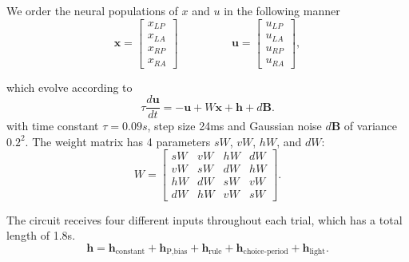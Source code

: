 \documentclass[11pt]{article}
\begin{document}
We order the neural populations of $x$ and $u$ in the following manner
\begin{equation}
\mathbf{x} = \begin{bmatrix} x_{LP} \\ x_{LA} \\ x_{RP} \\ x_{RA} \end{bmatrix} \hspace{2cm} \mathbf{u} = \begin{bmatrix} u_{LP} \\ u_{LA} \\ u_{RP} \\ u_{RA} \end{bmatrix},
\end{equation}

which evolve according to
\begin{equation}
\tau \frac{d\mathbf{u}}{dt} = -\mathbf{u} + W\mathbf{x} + \mathbf{h} + d\mathbf{B}.
\end{equation}
with time constant $\tau = 0.09s$, step size 24ms and Gaussian noise $d\mathbf{B}$ of variance $0.2^2$.  
The weight matrix has 4 parameters $sW$, $vW$, $hW$, and $dW$:
\begin{equation}
W = \begin{bmatrix} sW & vW & hW & dW \\ vW & sW & dW  & hW \\ hW & dW & sW & vW \\ dW  & hW & vW  & sW \end{bmatrix}.
\end{equation}

The circuit receives four different inputs throughout each trial, which has a total length of 1.8s.
\begin{equation}
\mathbf{h} = \mathbf{h}_{\text{constant}}  + \mathbf{h}_{\text{P,bias}} + \mathbf{h}_{\text{rule}} +  \mathbf{h}_{\text{choice-period}} + \mathbf{h}_{\text{light}}.
\end{equation}
\end{document}
